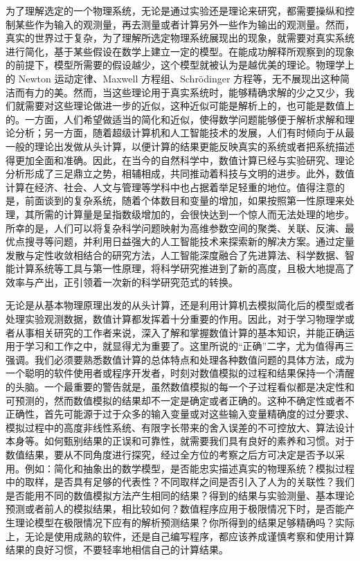 为了理解选定的一个物理系统，无论是通过实验还是理论来研究，都需要操纵和控制某些作为输入的观测量，再去测量或者计算另外一些作为输出的观测量。然而，真实的世界过于复杂，为了理解所选定物理系统展现出的现象，就需要对真实系统进行简化，基于某些假设在数学上建立一定的模型。在能成功解释所观察到的现象的前提下，模型所需要的假设越少，这个模型就被认为是越优美的理论。物理学上的 Newton 运动定律、Maxwell 方程组、Schrödinger 方程等，无不展现出这种简洁而有力的美。然而，当这些理论用于真实系统时，能够精确求解的少之又少，我们就需要对这些理论做进一步的近似，这种近似可能是解析上的，也可能是数值上的。一方面，人们希望做适当的简化和近似，使得数学问题能够便于解析求解和理论分析；另一方面，随着超级计算机和人工智能技术的发展，人们有时倾向于从最一般的理论出发做从头计算，以便计算的结果更能反映真实的系统或者把系统描述得更加全面和准确。因此，在当今的自然科学中，数值计算已经与实验研究、理论分析形成了三足鼎立之势，相辅相成，共同推动着科技与文明的进步。此外，数值计算在经济、社会、人文与管理等学科中也占据着举足轻重的地位。值得注意的是，前面谈到的复杂系统，随着个体数目和变量的增加，如果按照第一性原理来处理，其所需的计算量是呈指数级增加的，会很快达到一个惊人而无法处理的地步。所幸的是，人们可以将复杂科学问题映射为高维参数空间的聚类、关联、反演、最优点搜寻等问题，并利用日益强大的人工智能技术来探索新的解决方案。通过定量发散与定性收敛相结合的研究方法，人工智能深度融合了先进算法、科学数据、智能计算系统等工具与第一性原理，将科学研究推进到了新的高度，且极大地提高了效率与产出，正引领着一次新的科学研究范式的转换。

无论是从基本物理原理出发的从头计算，还是利用计算机去模拟简化后的模型或者处理实验观测数据，数值计算都发挥着十分重要的作用。因此，对于学习物理学或者从事相关研究的工作者来说，深入了解和掌握数值计算的基本知识，并能正确运用于学习和工作之中，就显得尤为重要了。这里所说的“正确”二字，尤为值得再三强调。我们必须要熟悉数值计算的总体特点和处理各种数值问题的具体方法，成为一个聪明的软件使用者或程序开发者，时刻对数值模拟的过程和结果保持一个清醒的头脑。一个最重要的警告就是，虽然数值模拟的每一个子过程看似都是决定性和可预测的，然而数值模拟的结果却不一定是确定或者正确的。这种不确定性或者不正确性，首先可能源于过于众多的输入变量或对这些输入变量精确度的过分要求、模拟过程中的高度非线性系统、有限字长带来的舍入误差的不可控放大、算法设计本身等。如何甄别结果的正误和可靠性，就需要我们具有良好的素养和习惯。对于数值结果，要从不同角度进行探究，经过全方位的考察之后方可决定是否予以采用。例如：简化和抽象出的数学模型，是否能忠实描述真实的物理系统？模拟过程中的取样，是否具有足够的代表性？不同取样之间是否引入了人为的关联性？我们是否能用不同的数值模拟方法产生相同的结果？得到的结果与实验测量、基本理论预测或者前人的模拟结果，相比较如何？数值程序应用于极限情况下时，是否能产生理论模型在极限情况下应有的解析预测结果？你所得到的结果足够精确吗？实际上，无论是使用成熟的软件，还是自己编写程序，都应该养成谨慎考察和使用计算结果的良好习惯，不要轻率地相信自己的计算结果。


